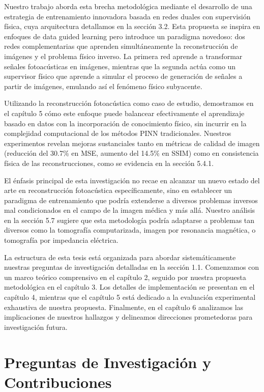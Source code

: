 Nuestro trabajo aborda esta brecha metodológica mediante el desarrollo de una estrategia de entrenamiento innovadora basada en redes duales con supervisión física, cuya arquitectura detallamos en la sección 3.2. Esta propuesta se inspira en enfoques de data guided learning pero introduce un paradigma novedoso: dos redes complementarias que aprenden simultáneamente la reconstrucción de imágenes y el problema físico inverso. La primera red aprende a transformar señales fotoacústicas en imágenes, mientras que la segunda actúa como un supervisor físico que aprende a simular el proceso de generación de señales a partir de imágenes, emulando así el fenómeno físico subyacente.

Utilizando la reconstrucción fotoacústica como caso de estudio, demostramos en el capítulo 5 cómo este enfoque puede balancear efectivamente el aprendizaje basado en datos con la incorporación de conocimiento físico, sin incurrir en la complejidad computacional de los métodos PINN tradicionales. Nuestros experimentos revelan mejoras sustanciales tanto en métricas de calidad de imagen (reducción del 30.7\% en MSE, aumento del 14.5\% en SSIM) como en consistencia física de las reconstrucciones, como se evidencia en la sección 5.4.1.

El énfasis principal de esta investigación no recae en alcanzar un nuevo estado del arte en reconstrucción fotoacústica específicamente, sino en establecer un paradigma de entrenamiento que podría extenderse a diversos problemas inversos mal condicionados en el campo de la imagen médica y más allá. Nuestro análisis en la sección 5.7 sugiere que esta metodología podría adaptarse a problemas tan diversos como la tomografía computarizada, imagen por resonancia magnética, o tomografía por impedancia eléctrica.

La estructura de esta tesis está organizada para abordar sistemáticamente nuestras preguntas de investigación detalladas en la sección 1.1. Comenzamos con un marco teórico comprensivo en el capítulo 2, seguido por nuestra propuesta metodológica en el capítulo 3. Los detalles de implementación se presentan en el capítulo 4, mientras que el capítulo 5 está dedicado a la evaluación experimental exhaustiva de nuestra propuesta. Finalmente, en el capítulo 6 analizamos las implicaciones de nuestros hallazgos y delineamos direcciones prometedoras para investigación futura.

\section{Preguntas de Investigación y Contribuciones}

